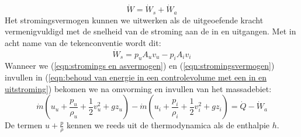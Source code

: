 \begin{equation}
	\dot{W} = \dot{W}_s + \dot{W}_a
	\label{eqn:stromings en asvermogen}
\end{equation}
Het stromingsvermogen kunnen we uitwerken als de uitgeoefende kracht vermenigvuldigd met de snelheid van de stroming aan de in en uitgangen. Met in acht name van de tekenconventie wordt dit:
\begin{equation}
	\dot{W}_s = p_u A_u v_u - p_i A_i v_i
	\label{eqn:stromingsvermogen}
\end{equation}
Wanneer we (\ref{eqn:stromings en asvermogen}) en (\ref{eqn:stromingsvermogen}) invullen in (\ref{eqn:behoud van energie in een controlevolume met een in en uitstroming}) bekomen we na omvorming en invullen van het massadebiet:
\begin{equation}
	\dot{m} (u_u + \frac{p_u}{\rho_u} + \frac{1}{2}v^2_u + g z_u) - \dot{m} (u_i + \frac{p_i}{\rho_i}+ \frac{1}{2}v^2_i + g z_i) = \dot{Q}-\dot{W}_a
	\label{eqn:behoud van energie in een controlevolume met een in en uitstroming asvermogen}
\end{equation}
De termen $u + \frac{p}{\rho}$ kennen we reeds uit de thermodynamica als de enthalpie $h$.

